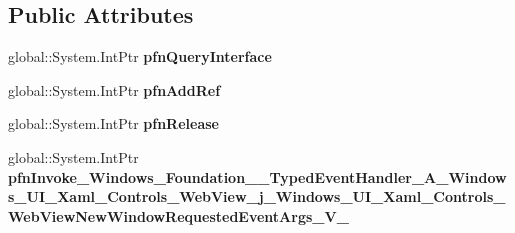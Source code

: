 \subsection*{Public Attributes}
\begin{DoxyCompactItemize}
\item 
\mbox{\label{struct_windows_1_1_foundation_1_1_typed_event_handler___a___windows___u_i___xaml___controls___wec42a721acbd095ac78e4a49a8bbda864_afdd53190693884560ff3997abf160db1}} 
global\+::\+System.\+Int\+Ptr {\bfseries pfn\+Query\+Interface}
\item 
\mbox{\label{struct_windows_1_1_foundation_1_1_typed_event_handler___a___windows___u_i___xaml___controls___wec42a721acbd095ac78e4a49a8bbda864_a3b44cc7ecd9f1f235d5250dd7c064634}} 
global\+::\+System.\+Int\+Ptr {\bfseries pfn\+Add\+Ref}
\item 
\mbox{\label{struct_windows_1_1_foundation_1_1_typed_event_handler___a___windows___u_i___xaml___controls___wec42a721acbd095ac78e4a49a8bbda864_ab2a9b27980e79bb530070070b4d7ec14}} 
global\+::\+System.\+Int\+Ptr {\bfseries pfn\+Release}
\item 
\mbox{\label{struct_windows_1_1_foundation_1_1_typed_event_handler___a___windows___u_i___xaml___controls___wec42a721acbd095ac78e4a49a8bbda864_a0740e04ee796ed30181b05503b9e3486}} 
global\+::\+System.\+Int\+Ptr {\bfseries pfn\+Invoke\+\_\+\+Windows\+\_\+\+Foundation\+\_\+\+\_\+\+Typed\+Event\+Handler\+\_\+\+A\+\_\+\+Windows\+\_\+\+U\+I\+\_\+\+Xaml\+\_\+\+Controls\+\_\+\+Web\+View\+\_\+j\+\_\+\+Windows\+\_\+\+U\+I\+\_\+\+Xaml\+\_\+\+Controls\+\_\+\+Web\+View\+New\+Window\+Requested\+Event\+Args\+\_\+\+V\+\_\+}
\end{DoxyCompactItemize}
